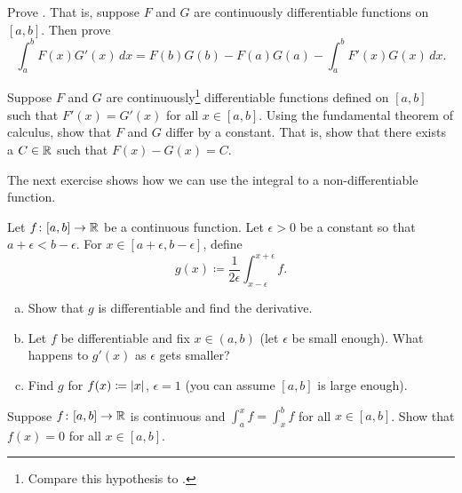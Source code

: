 \begin{exercise}
Prove \emph{}.  That is, suppose $F$ and
$G$ are continuously differentiable functions on $[a,b]$.  Then prove
\begin{equation*}
\int_a^b F(x)G'(x)\,dx
=
F(b)G(b)-F(a)G(a)
-
\int_a^b F'(x)G(x)\,dx .
\end{equation*}
\end{exercise}

\begin{exercise}
Suppose $F$ and $G$ are
continuously\footnote{
Compare this hypothesis to .}
differentiable
functions defined on $[a,b]$
such that $F'(x) = G'(x)$ for all $x \in [a,b]$.
Using the fundamental theorem of calculus,
show that $F$ and $G$ differ by a constant.  That is, show that
there exists a $C \in {\mathbb{R}}$ such that
$F(x)-G(x) = C$.
\end{exercise}

\begin{exnote}
The next exercise shows how we can use the integral to  a
non-differentiable function.
\end{exnote}

\begin{exercise} \label{exercise:smoothingout}
Let $f \colon [a,b] \to {\mathbb{R}}$ be a continuous function.  Let $\epsilon > 0$
be a constant so that $a+\epsilon < b-\epsilon$.  For $x \in [a+\epsilon,b-\epsilon]$, define
\begin{equation*}
g(x) \coloneqq \frac{1}{2\epsilon} \int_{x-\epsilon}^{x+\epsilon} f .
\end{equation*}
\begin{enumerate}[a)]
\item
Show that $g$ is differentiable and find the derivative.
\item
Let $f$ be differentiable and fix $x \in (a,b)$ (let $\epsilon$
be small enough).  What happens to $g'(x)$ as $\epsilon$ gets smaller?
\item
Find $g$ for $f(x) \coloneqq \left\lvert {x} \right\rvert$, $\epsilon = 1$ (you can assume 
$[a,b]$ is large enough).
\end{enumerate}
\end{exercise}

\begin{exercise}
Suppose $f \colon [a,b] \to {\mathbb{R}}$ is continuous and
$\int_a^x f = \int_x^b f$ for all $x \in [a,b]$.  Show that $f(x) = 0$
for all $x \in [a,b]$.
\end{exercise}


